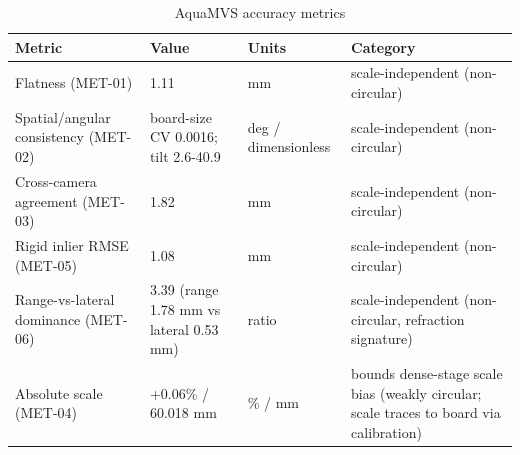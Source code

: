 \begin{table}[htbp]
  \centering
  \caption{AquaMVS accuracy metrics}
  \label{tab:aquamvs-metrics}
  \begin{tabular}{llll}
    \toprule
    Metric & Value & Units & Category \\
    \midrule
    Flatness (MET-01) & 1.11 & mm & scale-independent (non-circular) \\
    Spatial/angular consistency (MET-02) & board-size CV 0.0016; tilt 2.6-40.9 & deg / dimensionless & scale-independent (non-circular) \\
    Cross-camera agreement (MET-03) & 1.82 & mm & scale-independent (non-circular) \\
    Rigid inlier RMSE (MET-05) & 1.08 & mm & scale-independent (non-circular) \\
    Range-vs-lateral dominance (MET-06) & 3.39 (range 1.78 mm vs lateral 0.53 mm) & ratio & scale-independent (non-circular, refraction signature) \\
    Absolute scale (MET-04) & +0.06\% / 60.018 mm & \% / mm & bounds dense-stage scale bias (weakly circular; scale traces to board via calibration) \\
    \bottomrule
  \end{tabular}
\end{table}
